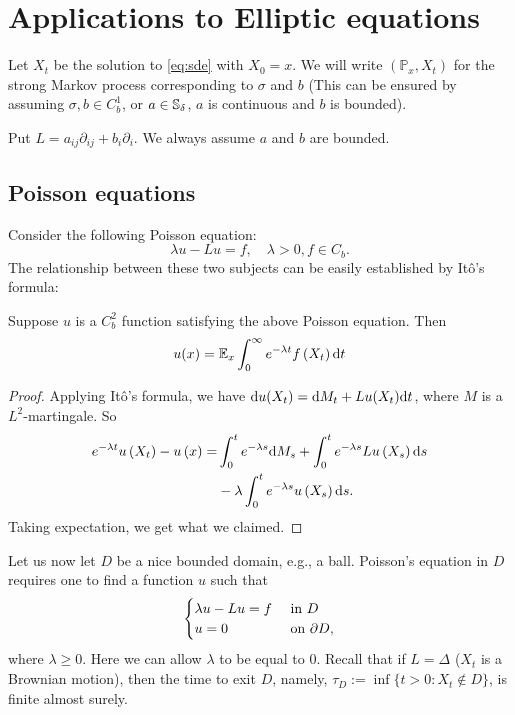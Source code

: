 \chapter{Applications to Elliptic equations}

	
Let $X_t$ be the solution to \eqref{eq:sde} with $X_0=x$. We will write $\left(\mathbb{P}_x, X_t\right)$ for the strong Markov process corresponding to $\sigma$ and $b$ (This can be ensured by assuming $\sigma, b\in C^1_b$, or $a\in {\mathbb S}_\delta$, $a$ is continuous and $b$ is bounded). 

Put \(L=a_{ij}\partial_{ij}+b_i\partial_i\). We always assume \(a\) and \(b\) are bounded. 
	
\section{Poisson equations}
Consider the following Poisson equation: 
\begin{equation}
    \lambda u - L u=f, \quad \lambda>0, f\in C_b. 
\end{equation}
The relationship between these two subjects can be easily established by It\^o's formula: 
\begin{theorem}\label{thm:FK1}
    Suppose $u$ is a $C^2_b$ function satisfying the above Poisson equation. Then
    \[
        u(x)={\mathbb E}_x \int_0^{\infty} e^{-\lambda t} f\left(X_t\right) \text{\rm{d}} t
    \]
\end{theorem}
\begin{proof}
    Applying It\^o's formula, we have $\text{\rm{d}} u(X_t)=\text{\rm{d}} M_t + Lu(X_t) \text{\rm{d}} t$, where \(M\) is a \(L^2\)-martingale. So 
    \[
        \begin{aligned}
            e^{-\lambda t} u\left(X_t\right)-u\left(x\right)=&\int_0^t e^{-\lambda s} \text{\rm{d}} M_s+\int_0^t e^{-\lambda s} L u\left(X_s\right) \text{\rm{d}} s \\
            &-\lambda \int_0^t e^{-\lambda s} u\left(X_s\right) \text{\rm{d}} s.
	\end{aligned}
    \]
Taking expectation, we get what we claimed. 
\end{proof}
	
Let us now let $D$ be a nice bounded domain, e.g., a ball. Poisson's equation in $D$ requires one to find a function $u$ such that 
	\begin{equation*}
		\begin{cases}
			\lambda u- Lu=f ~&\mbox{in}~ D\\
			u=0 ~&\mbox{on}~ \partial D, 
		\end{cases}
	\end{equation*}
	where $\lambda\geq 0$. Here we can allow $\lambda$ to be equal to $0$. Recall that if $L=\Delta$ ($X_t$ is a Brownian motion), then the time to exit $D$, namely, $\tau_D := \inf\{t>0: X_t \notin D\}$, is finite almost surely. 
	

